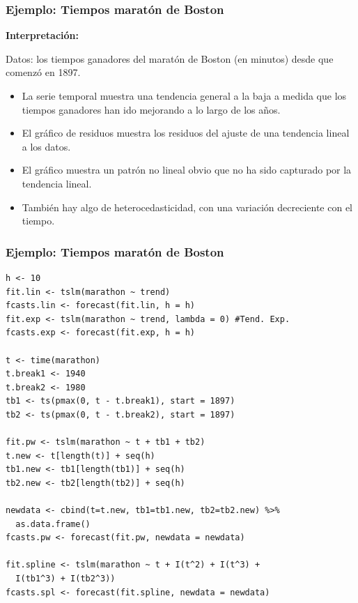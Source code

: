 \documentclass[10pt]{beamer}
\begin{document}




\begin{frame}[fragile]
\frametitle{Ejemplo: Tiempos maratón de Boston}

\textbf{Interpretación:}

\vspace{4mm}

Datos: los tiempos ganadores del maratón de Boston (en minutos) desde que comenzó en 1897. 

\vspace{3mm}

\begin{itemize}
\item La serie temporal muestra una tendencia general a la baja a medida que los tiempos ganadores han ido mejorando a lo largo de los años. 
\item El gráfico de residuos muestra los residuos del ajuste de una tendencia lineal a los datos. 
\item El gráfico muestra un patrón no lineal obvio que no ha sido capturado por la tendencia lineal. 
\item También hay algo de heterocedasticidad, con una variación decreciente con el tiempo.
\end{itemize}


\end{frame}





\begin{frame}[fragile]
\frametitle{Ejemplo: Tiempos maratón de Boston}

\lstset{language=r,label= ,caption= ,captionpos=b,numbers=none}
\begin{lstlisting}
h <- 10
fit.lin <- tslm(marathon ~ trend)
fcasts.lin <- forecast(fit.lin, h = h)
fit.exp <- tslm(marathon ~ trend, lambda = 0) #Tend. Exp.
fcasts.exp <- forecast(fit.exp, h = h)

t <- time(marathon)
t.break1 <- 1940
t.break2 <- 1980
tb1 <- ts(pmax(0, t - t.break1), start = 1897)
tb2 <- ts(pmax(0, t - t.break2), start = 1897)

fit.pw <- tslm(marathon ~ t + tb1 + tb2)
t.new <- t[length(t)] + seq(h)
tb1.new <- tb1[length(tb1)] + seq(h)
tb2.new <- tb2[length(tb2)] + seq(h)

newdata <- cbind(t=t.new, tb1=tb1.new, tb2=tb2.new) %>%
  as.data.frame()
fcasts.pw <- forecast(fit.pw, newdata = newdata)

fit.spline <- tslm(marathon ~ t + I(t^2) + I(t^3) +
  I(tb1^3) + I(tb2^3))
fcasts.spl <- forecast(fit.spline, newdata = newdata)
\end{lstlisting}

\end{frame}
\end{document}
